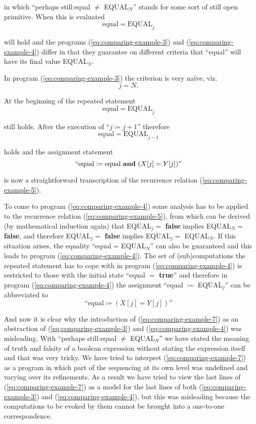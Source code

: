 \noindent
in which ``perhaps still:equal $\neq$ EQUAL$_N$'' stands for some sort of still open primitive. When this is evaluated
$$
\text{equal} = \text{EQUAL}_j
$$

\noindent
will hold and the programs (\ref{eq:comparing-example-3}) and (\ref{eq:comparing-example-4}) differ in that they guarantee on different criteria that ``equal'' will have its final value EQUAL$_N$.

In program (\ref{eq:comparing-example-3}) the criterion is very naïve, viz.
$$
j = N.
$$

\noindent
At the beginning of the repeated statement
$$
\text{equal} = \text{EQUAL}_j
$$

\noindent
still holds. After the execution of ``$j \coloneq j + 1$'' therefore
$$
\text{equal} = \text{EQUAL}_{j-1}
$$

\noindent
holds and the assignment statement
$$
\text{``equal} \coloneq \text{equal \textbf{and} } (X[j] = Y[j])"
$$

\noindent
is now a straightforward transcription of the recurrence relation (\ref{eq:comparing-example-5}).

To come to program (\ref{eq:comparing-example-4}) some analysis has to be applied to the recurrence relation (\ref{eq:comparing-example-5}), from which can be derived (by mathematical induction again) that EQUAL$_j =$ \textbf{false} implies EQUAL$_N =$ \textbf{false}, and therefore EQUAL$_j =$ \textbf{false} implies EQUAL$_j =$ EQUAL$_N$. If this situation arises, the equality ``equal = EQUAL$_N$'' can also be guaranteed and this leads to program (\ref{eq:comparing-example-4}). The set of (sub)computations the repeated statement has to cope with in program (\ref{eq:comparing-example-4}) is restricted to those with the initial state ``equal $=$ \textbf{true}'' and therefore in program (\ref{eq:comparing-example-4}) the assignment ``equal $\coloneq$ EQUAL$_j$'' can be abbreviated to
$$
\text{``equal} \coloneq (X[j] = Y[j])\text{''}
$$

And now it is clear why the introduction of (\ref{eq:comparing-example-7}) as an abstraction of (\ref{eq:comparing-example-3}) and (\ref{eq:comparing-example-4}) was misleading. With ``perhaps still:equal $\neq$ EQUAL$_N$'' we have stated the meaning of truth and falsity of a boolean expression without stating the expression itself and that was very tricky. We have tried to interpret (\ref{eq:comparing-example-7}) as a program in which part of the sequencing at its own level was undefined and varying over its refinements. As a result we have tried to view the last lines of (\ref{eq:comparing-example-7}) as a model for the last lines of both (\ref{eq:comparing-example-3}) and (\ref{eq:comparing-example-4}), but this was misleading because the computations to be evoked by them cannot be brought into a one-to-one correspondence.

